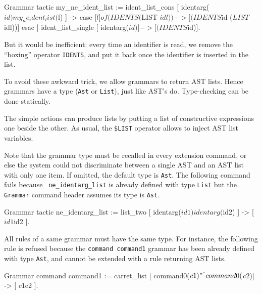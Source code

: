 \begin{coq_example*}
Grammar tactic my_ne_ident_list :=
  ident_list_cons [ identarg($id) my_ne_ident_list($l) ] ->
    case [$l] of
      (IDENTS ($LIST $idl)) -> [(IDENTS $id ($LIST $idl))]
    esac
| ident_list_single [ identarg($id) ] -> [(IDENTS $id)].
\end{coq_example*}

But it would be inefficient: every time an identifier is read, we
remove the ``boxing'' operator {\tt IDENTS}, and put it back once the
identifier is inserted in the list.

To avoid these awkward trick, we allow grammars to return AST
lists. Hence grammars have a type ({\tt Ast} or {\tt List}), just like
AST's do. Type-checking can be done statically.

The simple actions can produce lists by putting a list of constructive
expressions one beside the other. As usual, the {\tt\$LIST} operator
allows to inject AST list variables.


Note that the grammar type must be recalled in every extension
command, or else the system could not discriminate between a single
AST and an AST list with only one item. If omitted, the default type
is {\tt Ast}. The following command fails because {\tt
ne\_identarg\_list} is already defined with type {\tt List} but the
{\tt Grammar} command header assumes its type is {\tt Ast}.

\begin{coq_example}           
Grammar tactic ne_identarg_list :=
  list_two [ identarg($id1) identarg($id2) ] -> [ $id1 $id2 ]. 
\end{coq_example}

All rules of a same grammar must have the same type. For instance, the
following rule is refused because the \verb+command command1+ grammar
has been already defined with type {\tt Ast}, and cannot be extended
with a rule returning AST lists.

\begin{coq_example}           
Grammar command command1 :=
  carret_list [ command0($c1) "^" command0($c2)] -> [ $c1 $c2 ].
\end{coq_example}



